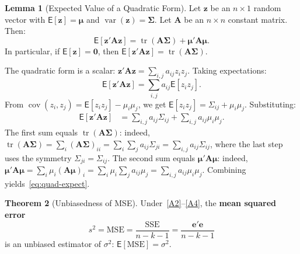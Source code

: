 \documentclass[12pt,a4paper]{article}
\makeatletter
\theoremstyle{definition}
\newtheorem{theorem}{Theorem}[section]
\newtheorem{lemma}[theorem]{Lemma}
\renewenvironment{proof}[1][\proofname]{\par
  \pushQED{\qed}%
  \normalfont \topsep6\p@\@plus6\p@\relax
  \trivlist
  \item[\hskip\labelsep\bfseries #1\@addpunct{.}]\ignorespaces
}{%
  \popQED\endtrivlist\@endpefalse
}
\newcommand\expc{\mathsf{E}}
\DeclareMathOperator\var{var}
\DeclareMathOperator\cov{cov}
\DeclareMathOperator\tr{tr}
\newcommand{\SSE}{\mathrm{SSE}}
\newcommand{\MSE}{\mathrm{MSE}}
\newcommand{\bzero}{\mathbf{0}}
\newcommand{\bz}{\mathbf{z}}
\newcommand{\bA}{\mathbf{A}}
\makeatother
\begin{document}
\begin{lemma}[Expected Value of a Quadratic Form]\label{lem:quadratic-form}
Let $\bz$ be an $n \times 1$ random vector with $\expc[\bz] = \boldsymbol\mu$ and $\var(\bz) = \boldsymbol\Sigma$. Let $\bA$ be an $n \times n$ constant matrix. Then:
\begin{equation}\label{eq:quad-expect}
\expc[\bz'\bA\bz] = \tr(\bA\boldsymbol\Sigma) + \boldsymbol\mu'\bA\boldsymbol\mu.
\end{equation}
In particular, if $\expc[\bz] = \bzero$, then $\expc[\bz'\bA\bz] = \tr(\bA\boldsymbol\Sigma)$.
\end{lemma}

\begin{proof}
The quadratic form is a scalar: $\bz'\bA\bz = \sum_{i,j} a_{ij} z_i z_j$. Taking expectations:
\[
\expc[\bz'\bA\bz] = \sum_{i,j} a_{ij} \expc[z_i z_j].
\]
From $\cov(z_i, z_j) = \expc[z_i z_j] - \mu_i\mu_j$, we get $\expc[z_i z_j] = \Sigma_{ij} + \mu_i\mu_j$. Substituting:
\begin{align*}
\expc[\bz'\bA\bz] &= \sum_{i,j} a_{ij}\Sigma_{ij} + \sum_{i,j} a_{ij}\mu_i\mu_j.
\end{align*}
The first sum equals $\tr(\bA\boldsymbol\Sigma)$: indeed, $\tr(\bA\boldsymbol\Sigma) = \sum_i (\bA\boldsymbol\Sigma)_{ii} = \sum_i \sum_j a_{ij}\Sigma_{ji} = \sum_{i,j} a_{ij}\Sigma_{ij}$, where the last step uses the symmetry $\Sigma_{ji} = \Sigma_{ij}$. The second sum equals $\boldsymbol\mu'\bA\boldsymbol\mu$: indeed, $\boldsymbol\mu'\bA\boldsymbol\mu = \sum_i \mu_i (\bA\boldsymbol\mu)_i = \sum_i \mu_i \sum_j a_{ij}\mu_j = \sum_{i,j} a_{ij}\mu_i\mu_j$. Combining yields~\eqref{eq:quad-expect}.
\end{proof}

\begin{theorem}[Unbiasedness of MSE]\label{thm:mse-unbiased}
Under~\ref{A2}--\ref{A4}, the \textbf{mean squared error}
\begin{equation}
s^2 = \MSE = \frac{\SSE}{n - k - 1} = \frac{\mathbf{e}'\mathbf{e}}{n - k - 1}
\end{equation}
is an unbiased estimator of $\sigma^2$: $\expc[\MSE] = \sigma^2$.
\end{theorem}
\end{document}
